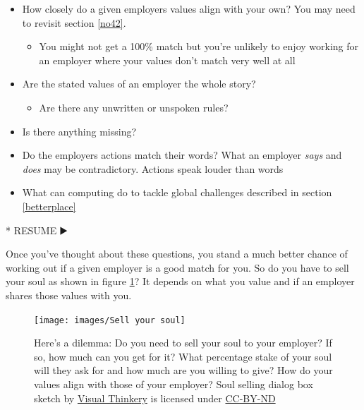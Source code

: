 \documentclass[
]{book}
\newenvironment{Shaded}{\begin{snugshade}}{\end{snugshade}}
\newcommand{\NormalTok}[1]{#1}
\newcommand{\SpecialStringTok}[1]{\textcolor[rgb]{0.31,0.60,0.02}{#1}}
\providecommand{\tightlist}{%
  \setlength{\itemsep}{0pt}\setlength{\parskip}{0pt}}
\begin{document}
\begin{itemize}
\tightlist
\item
  How closely do a given employers values align with your own? You may need to revisit section \ref{no42}.

  \begin{itemize}
  \tightlist
  \item
    You might not get a 100\% match but you're unlikely to enjoy working for an employer where your values don't match very well at all
  \end{itemize}
\item
  Are the stated values of an employer the whole story?

  \begin{itemize}
  \tightlist
  \item
    Are there any unwritten or unspoken rules?
  \end{itemize}
\item
  Is there anything missing?
\item
  Do the employers actions match their words? What an employer \emph{says} and \emph{does} may be contradictory. Actions speak louder than words
\item
  What can computing do to tackle global challenges described in section \ref{betterplace}
\end{itemize}

\begin{Shaded}
\begin{Highlighting}[]
\SpecialStringTok{* }\NormalTok{RESUME ▶️}
\end{Highlighting}
\end{Shaded}

Once you've thought about these questions, you stand a much better chance of working out if a given employer is a good match for you. So do you have to sell your soul as shown in figure \ref{fig:soul-fig}? It depends on what you value and if an employer shares those values with you.

\begin{figure}

{\centering \texttt{[image: images/Sell your soul]} 

}

\caption{Here's a dilemma: Do you need to sell your soul to your employer? If so, how much can you get for it? What percentage stake of your soul will they ask for and how much are you willing to give? How do your values align with those of your employer? Soul selling dialog box sketch by \href{https://visualthinkery.com/}{Visual Thinkery} is licensed under \href{https://creativecommons.org/licenses/by-nd/4.0/}{CC-BY-ND}}\label{fig:soul-fig}
\end{figure}
\end{document}
